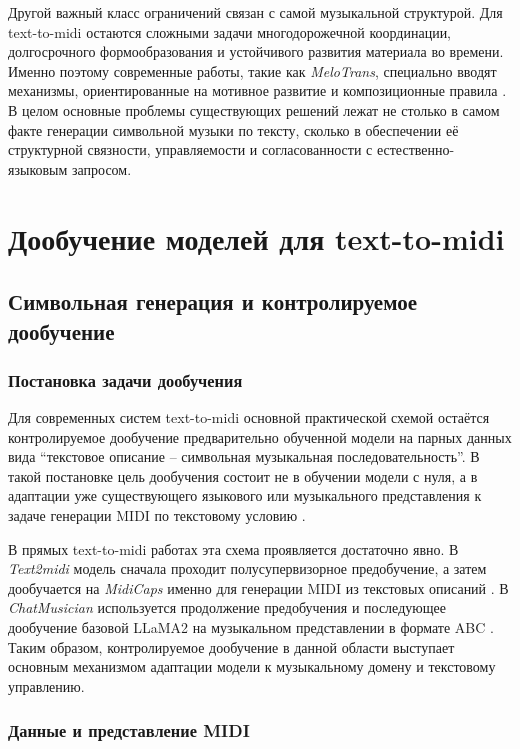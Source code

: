 \documentclass[a4paper,12pt]{extarticle}
\begin{document}
Другой важный класс ограничений связан с самой музыкальной структурой.
Для text-to-midi остаются сложными задачи многодорожечной координации,
долгосрочного формообразования и устойчивого развития материала во
времени. Именно поэтому современные работы, такие как \textit{MeloTrans},
специально вводят механизмы, ориентированные на мотивное развитие и
композиционные правила \cite{wang2024melotrans}. В целом основные
проблемы существующих решений лежат не столько в самом факте генерации
символьной музыки по тексту, сколько в обеспечении её структурной
связности, управляемости и согласованности с естественно-языковым
запросом.

\section{Дообучение моделей для text-to-midi}

\subsection{Символьная генерация и контролируемое дообучение}

\subsubsection{Постановка задачи дообучения}

Для современных систем text-to-midi основной практической схемой
остаётся контролируемое дообучение предварительно обученной модели на
парных данных вида ``текстовое описание -- символьная музыкальная
последовательность''. В такой постановке цель дообучения состоит не в
обучении модели с нуля, а в адаптации уже существующего языкового или
музыкального представления к задаче генерации MIDI по текстовому условию
\cite{text2midi2025,chatmusician2024}.

В прямых text-to-midi работах эта схема проявляется достаточно явно. В
\textit{Text2midi} модель сначала проходит полусупервизорное
предобучение, а затем дообучается на \textit{MidiCaps} именно для
генерации MIDI из текстовых описаний \cite{text2midi2025}. В
\textit{ChatMusician} используется продолжение предобучения и
последующее дообучение базовой LLaMA2 на музыкальном представлении в
формате ABC \cite{chatmusician2024}. Таким образом, контролируемое
дообучение в данной области выступает основным механизмом адаптации
модели к музыкальному домену и текстовому управлению.

\subsubsection{Данные и представление MIDI}
\end{document}
